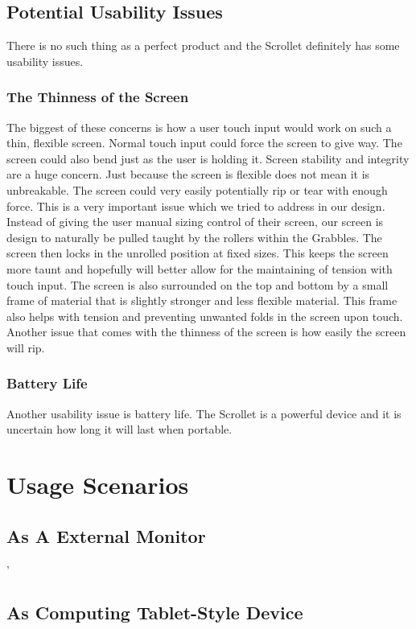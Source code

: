 \documentclass[a4paper]{article}
\begin{document}
\subsection{Potential Usability Issues}
There is no such thing as a perfect product and the Scrollet definitely has some usability issues.
\subsubsection{The Thinness of the Screen}
The biggest of these concerns is how a user touch input would work on such a thin, flexible screen. Normal touch input could force the screen to give way. \cite{Dijkstra} The screen could also bend just as the user is holding it. Screen stability and integrity are a huge concern. Just because the screen is flexible does not mean it is unbreakable. The screen could very easily potentially rip or tear with enough force. \cite{Dijkstra} This is a very important issue which we tried to address in our design. Instead of giving the user manual sizing control of their screen, our screen is design to naturally be pulled taught by the rollers within the Grabbles. The screen then locks in the unrolled position at fixed sizes. This keeps the screen more taunt and hopefully will better allow for the maintaining of tension with touch input. The screen is also surrounded on the top and bottom by a small frame of material that is slightly stronger and less flexible material. This frame also helps with tension and preventing unwanted folds in the screen upon touch. Another issue that comes with the thinness of the screen is how easily the screen will rip. 

\subsubsection{Battery Life}
Another usability issue is battery life. The Scrollet is a powerful device and it is uncertain how long it will last when portable. 

\section{Usage Scenarios}
\subsection{As A External Monitor}
'

\subsection{As Computing Tablet-Style Device}
\end{document}
